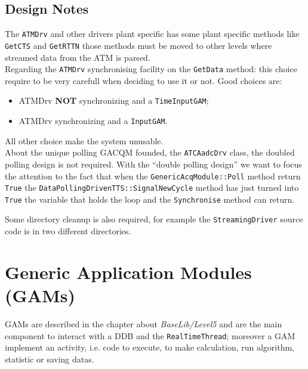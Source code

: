 \subsection{Design Notes}
The \texttt{ATMDrv} and other drivers plant specific has some plant specific methods like \texttt{GetCTS} and \texttt{GetRTTN} those methods must be moved to other levels where streamed data from the ATM is parsed. \\


Regarding the \texttt{ATMDrv} synchronising facility on the \texttt{GetData} method: this choice require to be very carefull when deciding to use it or not. Good choices are:
\begin{itemize}
 \item ATMDrv \textbf{NOT} synchronizing and a \texttt{TimeInputGAM};
 \item ATMDrv synchronizing and a \texttt{InputGAM}.
\end{itemize}
All other choice make the system unusable. \\


About the unique polling GACQM founded, the \texttt{ATCAadcDrv} class, the doubled polling design is not required. With the ``double polling design'' we want to focus the attention to the fact that when the \texttt{GenericAcqModule::Poll} method return \texttt{True} the \texttt{DataPollingDrivenTTS::SignalNewCycle} method has just turned into \texttt{True} the variable that holds the loop and the \texttt{Synchronise} method can return.

Some directory cleanup is also required, for example the \texttt{StreamingDriver} source code is in two different directories. \\






\section{Generic Application Modules (GAMs)}
GAMs are described in the chapter about \textit{BaseLib/Level5} and are the main component to interact with a DDB and the \texttt{RealTimeThread}; moreover a GAM implement an activity, i.e. code to execute, to make calculation, run algorithm, statistic or saving datas.

